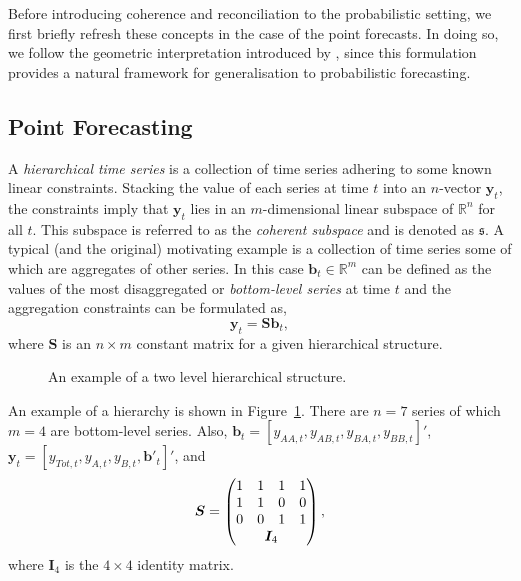 \documentclass[12pt]{article}
\theoremstyle{definition}
\begin{document}
Before introducing coherence and reconciliation to the probabilistic setting, we first briefly refresh these concepts in the case of the point forecasts.  In doing so, we follow the geometric interpretation introduced by \cite{PanEtAl2019HF}, since this formulation provides a natural framework for generalisation to probabilistic forecasting.


\subsection{Point Forecasting}\label{sec:Notat&Prelim}

A \emph{hierarchical time series} is a collection of time series adhering to some known linear constraints.  Stacking the value of each series at time $t$ into an $n$-vector ${\bm y}_t$, the constraints imply that ${\bm y}_t$ lies in an $m$-dimensional linear subspace of $\mathbb{R}^n$ for all $t$.  This subspace is referred to as the {\em coherent subspace} and is denoted as $\mathfrak{s}$.  A typical (and the original) motivating example is a collection of time series some of which are aggregates of other series. In this case $\bm{b}_t \in \mathbb{R}^m$ can be defined as the values of the most disaggregated or \emph{bottom-level series} at time $t$ and the aggregation constraints can be formulated as,
\begin{equation*}
\bm{y}_t = \bm{Sb}_t,
\end{equation*}
where $\bm{S}$ is an $n \times m$ constant matrix for a given hierarchical structure.

\begin{figure}[H]
	\begin{center}
		 
		 
		\qobitree
	\end{center}
	\caption{An example of a two level hierarchical structure.}\label{fig:twoL-hier}
\end{figure}
An example of a hierarchy is shown in Figure~\ref{fig:twoL-hier}. There are $n=7$ series of which $m=4$ are bottom-level series. Also, $\bm{b}_t = [y_{AA,t}, y_{AB,t}, y_{BA,t}, y_{BB,t}]'$, $\bm{y}_t = [y_{Tot,t},y_{A,t}, y_{B,t},\bm{b}'_t]'$,  and
\[
\bm{S} = \begin{pmatrix}
1 & 1 & 1 & 1 \\
1 & 1 & 0 & 0 \\
0 & 0 & 1 & 1 \\
& \multicolumn{2}{c}{\bm{I}_4} &
\end{pmatrix},
\]
where $\bm{I}_4$ is the $4\times 4$ identity matrix.
\end{document}
